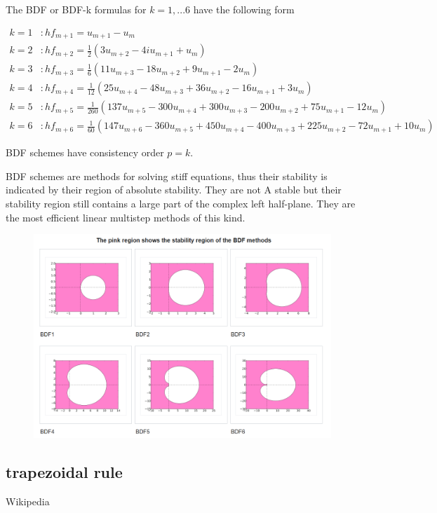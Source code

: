 	The BDF or BDF-k formulas for $k=1,...6$ have the following form
	
	\begin{align*}
		k = 1 &: h f_{m+1} = u_{m+1} - u_m \\
		k = 2 &: h f_{m+2} = \frac{1}{2} (3 u_{m+2} - 4 iu_{m+1} + u_m) \\
		k = 3 &: h f_{m+3} = \frac{1}{6} (11 u_{m+3} - 18 u_{m+2} + 9 u_{m+1} - 2 u_m) \\
		k = 4 &: h f_{m+4} = \frac{1}{12} (25 u_{m+4} - 48 u_{m+3} + 36 u_{m+2} - 16 u_{m+1} + 3 u_m) \\
		k = 5 &: h f_{m+5} = \frac{1}{260} (137 u_{m+5} - 300 u_{m+4} + 300 u_{m+3} - 200 u_{m+2} +75 u_{m+1} -12 u_m) \\
		k = 6 &: h f_{m+6} = \frac{1}{60} (147 u_{m+6} - 360 u_{m+5} + 450 u_{m+4} - 400 u_{m+3} + 225 u_{m+2} - 72 u_{m+1} + 10 u_m)
	\end{align*}
	
	BDF schemes have consistency order $p = k$.
	
	BDF schemes are methods for solving stiff equations, thus their stability is indicated by their region of absolute stability. They are not A stable but their stability region still contains a large part of the complex left half-plane. They are the most efficient linear multistep methods of this kind.
	
	\begin{figure}[H]
		\centering
		\includegraphics[width=0.7\linewidth]{screenshot020}
		\caption{}
		\label{fig:screenshot020}
	\end{figure}
	
	
	
	\subsection{trapezoidal rule}
	
	Wikipedia
	
